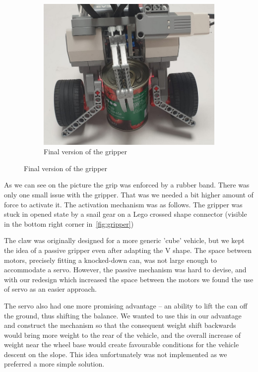 \documentclass{article}
\begin{document}
\begin{figure}[!htbp]
\begin{subfigure}{0.4\textwidth}
		\includegraphics[width=\textwidth]{./figures/finalGripper.jpeg}
		\caption{Final version of the gripper}
		\label{fig:finalGripper}
	\end{subfigure}
\end{figure}

As we can see on the picture the grip was enforced by a rubber band. There was only one small issue with the gripper.
That was we needed a bit higher amount of force to activate it. The activation mechanism was as follows. The gripper was
stuck in opened state by a snail gear on a Lego crossed shape connector (visible in the bottom right corner
in~\ref{fig:gripper})

The claw was originally designed for a more generic 'cube' vehicle, but we kept the idea of a passive gripper even after
adapting the V shape. The space between motors, precisely fitting a knocked-down can, was not large enough to accommodate
a servo. However, the passive mechanism was hard to devise, and with our redesign which increased the space between
the motors we found the use of servo as an easier approach.

The servo also had one more promising advantage -- an ability to lift the can off the ground, thus shifting the balance.
We wanted to use this in our advantage and construct the mechanism so that the consequent weight shift backwards would
bring more weight to the rear of the vehicle, and the overall increase of weight near the wheel base would create
favourable conditions for the vehicle descent on the slope. This idea unfortunately was not implemented as we preferred
a more simple solution.
\end{document}
